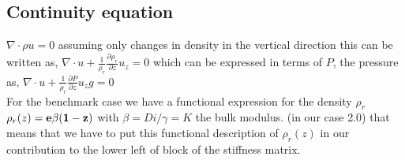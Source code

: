 \subsection{Continuity equation}

$\nabla \cdot \rho u = 0$
assuming only changes in density in the vertical direction this can be written as,
$\nabla \cdot u + \frac{1}{\rho_{r}} \frac{\partial \rho_{r} }{\partial z} u_{z}= 0$
which can be expressed in terms of $P$, the pressure as,
$\nabla \cdot u + \frac{1}{\rho_{r}} \frac{\partial P }{\partial z} u_{z} g= 0$ \\
For the benchmark case we have a functional expression for the density $\rho_{r}$ \\
$\rho_{r}(z) = \bf e{\beta(1-z)}$ with $\beta = Di/\gamma = K$ the bulk modulus. (in our case 2.0)
that means that we have to put this functional description of $\rho_{r}(z)$ in our contribution to the lower left of block of the stiffness matrix.
